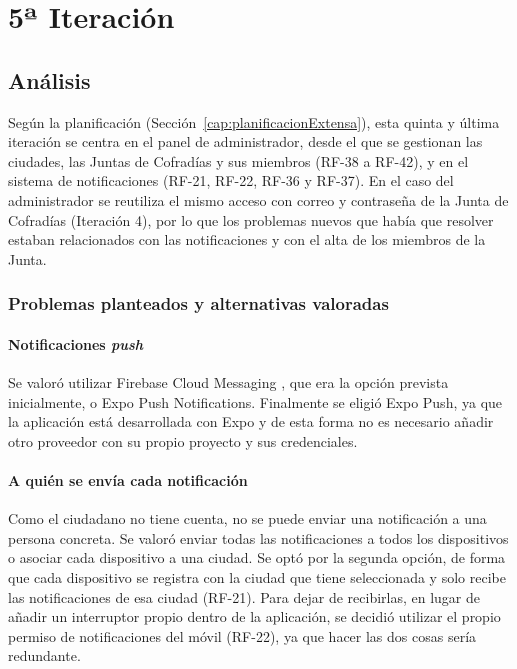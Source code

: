 \section{5ª Iteración}\label{cap:5_iteracion}

\subsection{Análisis}

Según la planificación (Sección~\ref{cap:planificacionExtensa}), esta quinta y última iteración se centra en el panel de administrador, desde el que se gestionan las ciudades, las Juntas de Cofradías y sus miembros (RF-38 a RF-42), y en el sistema de notificaciones (RF-21, RF-22, RF-36 y RF-37). En el caso del administrador se reutiliza el mismo acceso con correo y contraseña de la Junta de Cofradías (Iteración 4), por lo que los problemas nuevos que había que resolver estaban relacionados con las notificaciones y con el alta de los miembros de la Junta.

\subsubsection{Problemas planteados y alternativas valoradas}

\paragraph{Notificaciones \emph{push}}
Se valoró utilizar Firebase Cloud Messaging \cite{firebasefcm}, que era la opción prevista inicialmente, o Expo Push Notifications. Finalmente se eligió Expo Push, ya que la aplicación está desarrollada con Expo y de esta forma no es necesario añadir otro proveedor con su propio proyecto y sus credenciales.

\paragraph{A quién se envía cada notificación}
Como el ciudadano no tiene cuenta, no se puede enviar una notificación a una persona concreta. Se valoró enviar todas las notificaciones a todos los dispositivos o asociar cada dispositivo a una ciudad. Se optó por la segunda opción, de forma que cada dispositivo se registra con la ciudad que tiene seleccionada y solo recibe las notificaciones de esa ciudad (RF-21). Para dejar de recibirlas, en lugar de añadir un interruptor propio dentro de la aplicación, se decidió utilizar el propio permiso de notificaciones del móvil (RF-22), ya que hacer las dos cosas sería redundante.

